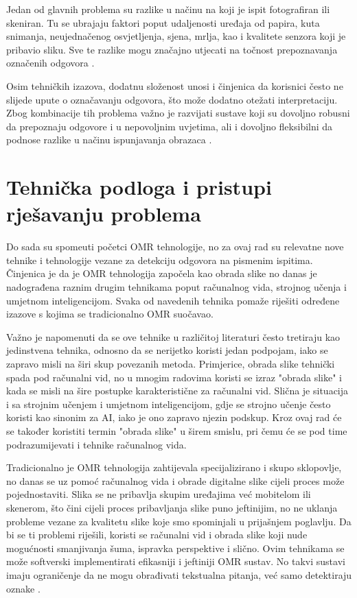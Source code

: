\documentclass{foi}
\begin{document}
Jedan od glavnih problema su razlike u načinu na koji je ispit fotografiran ili skeniran. Tu se ubrajaju faktori poput udaljenosti uređaja od papira, kuta snimanja, neujednačenog osvjetljenja, sjena, mrlja, kao i kvalitete senzora koji je pribavio sliku. Sve te razlike mogu značajno utjecati na točnost prepoznavanja označenih odgovora \cite{OMRart}.

Osim tehničkih izazova, dodatnu složenost unosi i činjenica da korisnici često ne slijede upute o označavanju odgovora, što može dodatno otežati interpretaciju. Zbog kombinacije tih problema važno je razvijati sustave koji su dovoljno robusni da prepoznaju odgovore i u nepovoljnim uvjetima, ali i dovoljno fleksibilni da podnose razlike u načinu ispunjavanja obrazaca \cite{OMRart}.

\section{Tehnička podloga i pristupi rješavanju problema}

Do sada su spomeuti početci OMR tehnologije, no za ovaj rad su relevatne nove tehnike i tehnologije vezane za detekciju odgovora na pismenim ispitima. Činjenica je da je OMR tehnologija započela kao obrada slike no danas je nadograđena raznim drugim tehnikama poput računalnog vida, strojnog učenja i umjetnom inteligencijom. Svaka od navedenih tehnika pomaže riješiti određene izazove s kojima se tradicionalno OMR suočavao.

Važno je napomenuti da se ove tehnike u različitoj literaturi često tretiraju kao jedinstvena tehnika, odnosno da se nerijetko koristi jedan podpojam, iako se zapravo misli na širi skup povezanih metoda. Primjerice, obrada slike tehnički spada pod računalni vid, no u mnogim radovima koristi se izraz "obrada slike" i kada se misli na šire postupke karakteristične za računalni vid. Slična je situacija i sa strojnim učenjem i umjetnom inteligencijom, gdje se strojno učenje često koristi kao sinonim za AI, iako je ono zapravo njezin podskup. Kroz ovaj rad će se također koristiti termin "obrada slike" u širem smislu, pri čemu će se pod time podrazumijevati i tehnike računalnog vida.

Tradicionalno je OMR tehnologija zahtijevala specijalizirano i skupo sklopovlje, no danas se uz pomoć računalnog vida i obrade digitalne slike cijeli proces može pojednostaviti. Slika se ne pribavlja skupim uređajima već mobitelom ili skenerom, što čini cijeli proces pribavljanja slike puno jeftinijim, no ne uklanja probleme vezane za kvalitetu slike koje smo spominjali u prijašnjem poglavlju. Da bi se ti problemi riješili, koristi se računalni vid i obrada slike koji nude mogućnosti smanjivanja šuma, ispravka perspektive i slično. Ovim tehnikama se može softverski implementirati efikasniji i jeftiniji OMR sustav. No takvi sustavi imaju ograničenje da ne mogu obrađivati tekstualna pitanja, već samo detektiraju oznake \cite{OMRImageProcessing}.
\end{document}
